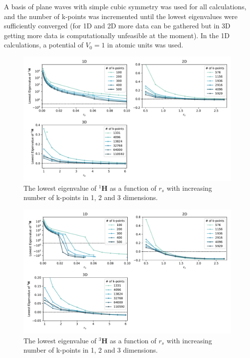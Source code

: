 \documentclass[preprint, journal=prl]{revtex4-1}
\begin{document}
  A basis of plane waves with simple cubic symmetry was used for all calculations, and the number of k-points was incremented until the lowest eigenvalues were sufficiently converged {\color{red} (for 1D and 2D more data can be gathered but in 3D getting more data is computationally unfeasible at the moment)}. In the 1D calculations, a potential of $V_0 = 1$ in atomic units was used.
  \begin{figure}[H]
    \centering
    \includegraphics[width=\textwidth]{../../images/singlet-stability-convergence.pdf}
    \caption{The lowest eigenvalue of ${}^1\mathbf{H}$ as a function of $r_s$ with increasing number of k-points in 1, 2 and 3 dimensions.}
    \label{fig:singlet_convergence}
  \end{figure}
  \begin{figure}[H]
    \centering
    \includegraphics[width=\textwidth]{../../images/triplet-stability-convergence.pdf}
    \caption{The lowest eigenvalue of ${}^3\mathbf{H}$ as a function of $r_s$ with increasing number of k-points in 1, 2 and 3 dimensions.}
    \label{fig:triplet_convergence}
  \end{figure}
\end{document}
